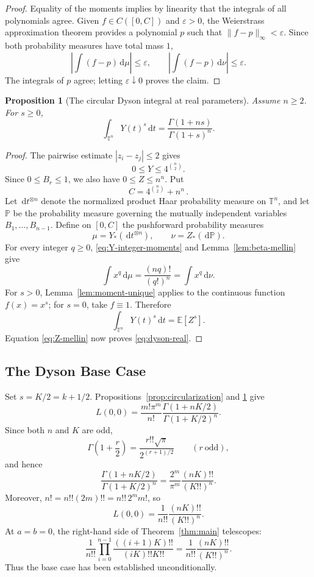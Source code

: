\documentclass[11pt,a4paper]{article}
\newtheorem{proposition}[theorem]{Proposition}
\theoremstyle{definition}
\newcommand{\T}{\mathbb T}
\newcommand{\E}{\mathbb E}
\newcommand{\dd}{\,\mathrm d}
\begin{document}
\begin{proof}
Equality of the moments implies by linearity that the integrals of all
polynomials agree. Given $f\in C([0,C])$ and $\varepsilon>0$, the
Weierstrass approximation theorem \cite{Rudin1976} provides a polynomial
$p$ such that $\|f-p\|_\infty<\varepsilon$. Since both probability
measures have total mass $1$,
\[
\left|\int(f-p)\dd\mu\right|\le\varepsilon,\qquad
\left|\int(f-p)\dd\nu\right|\le\varepsilon.
\]
The integrals of $p$ agree; letting $\varepsilon\downarrow0$ proves the
claim.
\end{proof}

\begin{proposition}[The circular Dyson integral at real parameters]
\label{prop:dyson-real}
Assume $n\ge2$. For $s\ge0$,
\begin{equation}\label{eq:dyson-real}
\int_{\T^n}Y(t)^s\dd t
=\frac{\Gamma(1+ns)}{\Gamma(1+s)^n}.
\end{equation}
\end{proposition}

\begin{proof}
The pairwise estimate $|z_i-z_j|\le2$ gives
\[
 0\le Y\le4^{\binom n2}.
\]
Since $0\le B_r\le1$, we also have $0\le Z\le n^n$. Put
\[
C=4^{\binom n2}+n^n
\,.
\]
Let $\dd t^{\otimes n}$ denote the normalized product Haar probability
measure on $\T^n$, and let $\mathbb P$ be the probability measure
governing the mutually independent variables $B_1,\ldots,B_{n-1}$.
Define on $[0,C]$ the pushforward probability measures
\[
\mu=Y_*(\dd t^{\otimes n}),\qquad
\nu=Z_*(\dd\mathbb P).
\]
For every integer $q\ge0$, \eqref{eq:Y-integer-moments} and
Lemma~\ref{lem:beta-mellin} give
\[
\int x^q\dd\mu
=\frac{(nq)!}{(q!)^n}
=\int x^q\dd\nu.
\]
For $s>0$, Lemma~\ref{lem:moment-unique} applies to the continuous
function $f(x)=x^s$; for $s=0$, take $f\equiv1$. Therefore
\[
\int_{\T^n}Y(t)^s\dd t=\E[Z^s].
\]
Equation \eqref{eq:Z-mellin} now proves \eqref{eq:dyson-real}.
\end{proof}

\subsection{The Dyson Base Case}

Set $s=K/2=k+1/2$. Propositions~\ref{prop:circularization} and
\ref{prop:dyson-real} give
\begin{equation}\label{eq:base-gamma}
L(0,0)=\frac{m!\pi^m}{n!}
\frac{\Gamma(1+nK/2)}{\Gamma(1+K/2)^n}.
\end{equation}
Since both $n$ and $K$ are odd,
\[
\Gamma\left(1+\frac r2\right)
=\frac{r!!\sqrt\pi}{2^{(r+1)/2}}
\qquad(r\ \text{odd}),
\]
and hence
\[
\frac{\Gamma(1+nK/2)}{\Gamma(1+K/2)^n}
=\frac{2^m}{\pi^m}\frac{(nK)!!}{(K!!)^{n}}.
\]
Moreover,
$n!=n!!(2m)!!=n!!\,2^m m!$, so
\begin{equation}\label{eq:base}
 L(0,0)=\frac1{n!!}\frac{(nK)!!}{(K!!)^{n}}.
\end{equation}
At $a=b=0$, the right-hand side of Theorem~\ref{thm:main} telescopes:
\[
\frac1{n!!}\prod_{i=0}^{n-1}
\frac{((i+1)K)!!}{(iK)!!K!!}
=\frac1{n!!}\frac{(nK)!!}{(K!!)^{n}}.
\]
Thus the base case has been established unconditionally.
\end{document}
